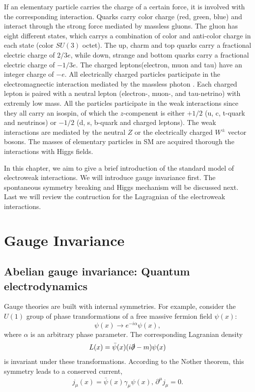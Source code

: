 If an elementary particle carries the charge of a certain force, it is involved with the corresponding interaction. Quarks carry color charge (red, green, blue) and interact through the strong force mediated by massless gluons. The gluon has eight different states, which carrys a combination of color and anti-color charge in each state (color $SU(3)$ octet). The up, charm and top quarks carry a fractional electric charge of $2/3e$, while down, strange and bottom quarks carry a fractional electric charge of $-1/3e$. The charged leptons(electron, muon and tau) have an integer charge of $-e$. All electrically charged particles participate in the electromagnectic interaction mediated by the massless photon . Each charged lepton is paired with a neutral lepton (electron-, muon-, and tau-netrino) with extremly low mass. All the particles participate in the weak interactions since they all carry an isospin, of which the $z$-compenent is either $+1/2$ (u, c, t-quark and neutrinos) or $-1/2$ (d, s, b-quark and charged leptons). The weak interactions are mediated by the neutral $Z$ or the electrically charged $W^{\pm}$ vector bosons. The masses of elementary particles in SM are acquired thorough the interactions with Higgs fields. 

In this chapter, we aim to give a brief introduction of the standard model of electroweak interactions\cite{H.P.PhyRep, BFLWQFT2, CQ}. We will introduce gauge invariance first. The spontaneous symmetry breaking and Higgs mechanism will be discussed next. Last we will review the contruction for the Lagragnian of the electroweak interactions.   


\section{Gauge Invariance}
\subsection{Abelian gauge invariance: Quantum electrodynamics}
Gauge theories are built with internal symmetries. For example, consider the $U(1)$ group of phase transformations of a free massive fermion field $\psi(x)$:
\begin{equation}
\psi(x)\to e^{-i\alpha}\psi(x),
\end{equation}
where $\alpha$ is an arbitrary phase parameter. The corresponding Lagranian density 
\begin{equation}
L(x)=\bar{\psi}(x)(i\slashed{\partial}-m)\psi(x)
\end{equation}
is invariant under these transformations. According to the N$\ddot{o}$ther theorem, this symmetry leads to a conserved current, 
\begin{eqnarray}
j_{\mu}(x)=\bar{\psi}(x)\gamma_\mu\psi(x),\hspace{2pt}
\partial^{\mu}j_\mu = 0.
\end{eqnarray}

